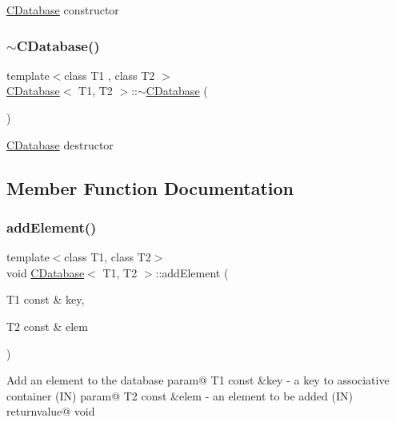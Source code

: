 \hyperlink{classCDatabase}{C\+Database} constructor \mbox{\label{classCDatabase_a2b3592b975d43dfb06e4bac2a4245c7b}} 
\subsubsection{\texorpdfstring{$\sim$\+C\+Database()}{~CDatabase()}}
{\footnotesize\ttfamily template$<$class T1 , class T2 $>$ \\
\hyperlink{classCDatabase}{C\+Database}$<$ T1, T2 $>$\+::$\sim$\hyperlink{classCDatabase}{C\+Database} (\begin{DoxyParamCaption}{ }\end{DoxyParamCaption})}

\hyperlink{classCDatabase}{C\+Database} destructor 

\subsection{Member Function Documentation}
\mbox{\label{classCDatabase_a269a0a23ba838e0c6ce533017a0d635a}} 
\subsubsection{\texorpdfstring{add\+Element()}{addElement()}}
{\footnotesize\ttfamily template$<$class T1, class T2$>$ \\
void \hyperlink{classCDatabase}{C\+Database}$<$ T1, T2 $>$\+::add\+Element (\begin{DoxyParamCaption}\item[{T1 const \&}]{key,  }\item[{T2 const \&}]{elem }\end{DoxyParamCaption})}

Add an element to the database param@ T1 const \&key -\/ a key to associative container (IN) param@ T2 const \&elem -\/ an element to be added (IN) returnvalue@ void \mbox{\label{classCDatabase_a7991d341e324528af43b4a1a2a09f39f}} 
